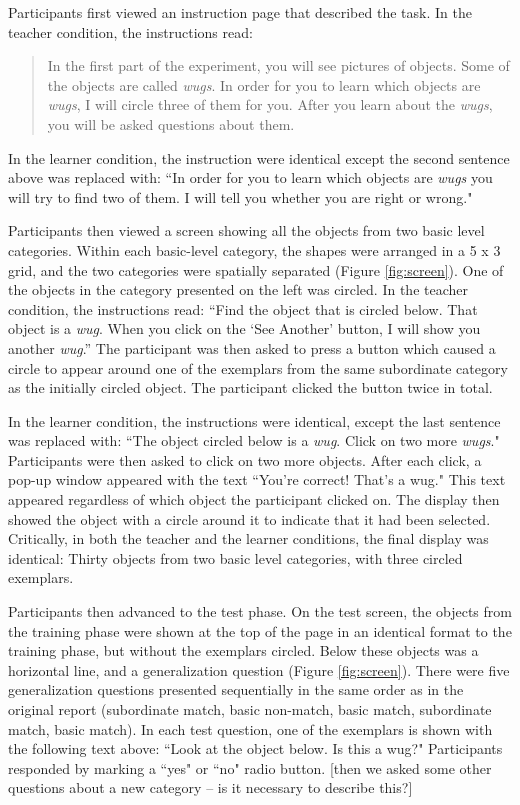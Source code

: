 \documentclass[man]{apa2}
\begin{document}
Participants first viewed an instruction page that described the task. In the teacher condition, the instructions read: 
\begin{quote}
In the first part of the experiment, you will see pictures of objects. Some of the objects are called  \textit{wugs}. In order for you to learn which objects are  \textit{wugs}, I will circle three of them for you. After you learn about the  \textit{wugs}, you will be asked questions about them.
\end{quote}
In the learner condition, the instruction were identical except the second sentence above was replaced with: ``In order for you to learn which objects are  \textit{wugs} you will try to find two of them. I will tell you whether you are right or wrong."

Participants then viewed a screen showing all the objects from two basic level categories. Within each basic-level category, the shapes were arranged in a 5 x 3 grid, and the two categories were spatially separated (Figure \ref{fig:screen}). One of the objects in the category presented on the left  was circled. In the teacher condition, the instructions read: ``Find the object that is circled below. That object is a \textit{wug}. When you click on the `See Another' button, I will show you another \textit{wug}.'' The participant  was then asked to press a button which caused a circle to appear around one of the exemplars from the same subordinate category as the initially circled object. The participant clicked the button twice in total. 

In the learner condition, the instructions were identical, except the last sentence was replaced with: ``The object circled below is a \textit{wug}.  Click on two more \textit{wugs}." Participants were then asked to click on two more objects. After each click, a pop-up window appeared with the text ``You're correct! That's a wug." This text appeared regardless of which object the participant clicked on. The display then showed the object with a circle around it to indicate that it had been selected. Critically, in both the teacher and the learner conditions, the final display was identical: Thirty objects from two basic level categories, with three circled exemplars.

Participants then advanced to the test phase. On the test screen, the objects from the training phase were shown at the top of the page in an identical format to the training phase, but without the exemplars circled. Below these objects was a horizontal line, and a generalization question (Figure \ref{fig:screen}). There were five generalization questions presented sequentially in the same order as in the original report (subordinate match, basic non-match, basic match, subordinate match, basic match). In each test question, one of the exemplars is shown with the following text above: ``Look at the object below. Is this a wug?" Participants  responded by marking a ``yes" or ``no" radio button.  [then we asked some other questions about a new category -- is it necessary to describe this?]
\end{document}
